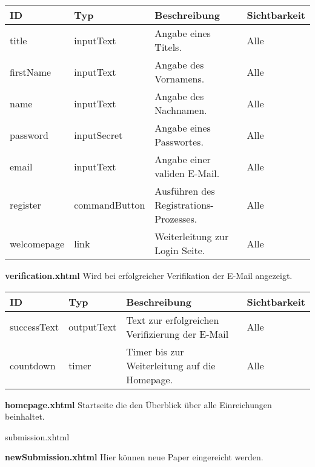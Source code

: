 \begin{tabular}[H]{|m{2cm}|m{3cm}|m{6cm}|m{2.5cm}|}
    \hline
    \textbf{ID} & \textbf{Typ} & \textbf{Beschreibung} & \textbf{Sichtbarkeit} \\
    \hline
    \hline
    title & inputText & Angabe eines Titels. & Alle \\
    \hline
    firstName & inputText & Angabe des Vornamens. & Alle \\
    \hline
    name & inputText & Angabe des Nachnamen. & Alle \\
    \hline
    password & inputSecret & Angabe eines Passwortes. & Alle \\
    \hline
    email & inputText & Angabe einer validen E-Mail. & Alle \\
    \hline
    register & commandButton & Ausführen des Registrations-Prozesses. & Alle \\
    \hline
    welcomepage & link & Weiterleitung zur Login Seite. & Alle\\
    \hline
\end{tabular}

\textbf{verification.xhtml} Wird bei erfolgreicher Verifikation der E-Mail angezeigt.

\begin{tabular}[H]{|m{2cm}|m{3cm}|m{6cm}|m{2.5cm}|}
    \hline
    \textbf{ID} & \textbf{Typ} & \textbf{Beschreibung} & \textbf{Sichtbarkeit} \\
    \hline
    \hline
    successText & outputText & Text zur erfolgreichen Verifizierung der E-Mail & Alle\\
    \hline
    countdown & timer & Timer bis zur Weiterleitung auf die Homepage. & Alle \\
    \hline
\end{tabular}

\textbf{homepage.xhtml} Startseite die den Überblick über alle Einreichungen beinhaltet.

submission.xhtml

\textbf{newSubmission.xhtml} Hier können neue Paper eingereicht werden.


